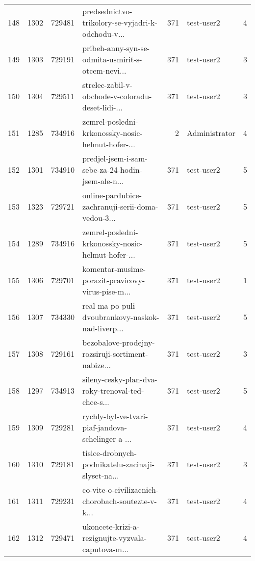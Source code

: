 \begin{tabular}{lrrlrlr}
148  &       1302 &   729481 &  predsednictvo-trikolory-se-vyjadri-k-odchodu-v... &      371 &                   test-user2 &               4 \\
149  &       1303 &   729191 &  pribeh-anny-syn-se-odmita-usmirit-s-otcem-nevi... &      371 &                   test-user2 &               3 \\
150  &       1304 &   729511 &  strelec-zabil-v-obchode-v-coloradu-deset-lidi-... &      371 &                   test-user2 &               3 \\
151  &       1285 &   734916 &  zemrel-posledni-krkonossky-nosic-helmut-hofer-... &        2 &                Administrator &               4 \\
152  &       1301 &   734910 &  predjel-jsem-i-sam-sebe-za-24-hodin-jsem-ale-n... &      371 &                   test-user2 &               5 \\
153  &       1323 &   729721 &  online-pardubice-zachranuji-serii-doma-vedou-3... &      371 &                   test-user2 &               5 \\
154  &       1289 &   734916 &  zemrel-posledni-krkonossky-nosic-helmut-hofer-... &      371 &                   test-user2 &               5 \\
155  &       1306 &   729701 &  komentar-musime-porazit-pravicovy-virus-pise-m... &      371 &                   test-user2 &               1 \\
156  &       1307 &   734330 &  real-ma-po-puli-dvoubrankovy-naskok-nad-liverp... &      371 &                   test-user2 &               5 \\
157  &       1308 &   729161 &  bezobalove-prodejny-rozsiruji-sortiment-nabize... &      371 &                   test-user2 &               3 \\
158  &       1297 &   734913 &  sileny-cesky-plan-dva-roky-trenoval-ted-chce-s... &      371 &                   test-user2 &               5 \\
159  &       1309 &   729281 &  rychly-byl-ve-tvari-piaf-jandova-schelinger-a-... &      371 &                   test-user2 &               4 \\
160  &       1310 &   729181 &  tisice-drobnych-podnikatelu-zacinaji-slyset-na... &      371 &                   test-user2 &               3 \\
161  &       1311 &   729231 &  co-vite-o-civilizacnich-chorobach-soutezte-v-k... &      371 &                   test-user2 &               4 \\
162  &       1312 &   729471 &  ukoncete-krizi-a-rezignujte-vyzvala-caputova-m... &      371 &                   test-user2 &               4 \\

\end{tabular}
